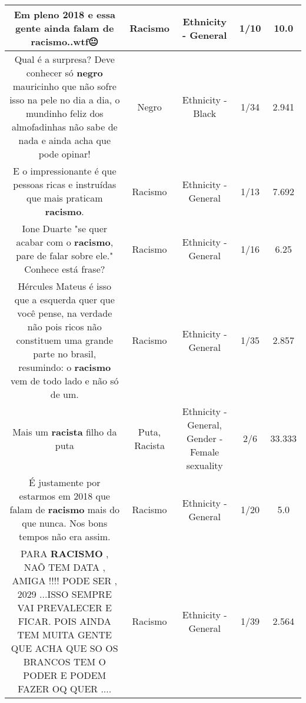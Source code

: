 \documentclass[11pt]{article}
\newlength\mylength
\begin{document}
\begin{center}
\begin{longtable}{|C{.65\mylength}|C{.30\mylength}|C{.12\mylength}|C{.12\mylength}|C{.12\mylength}|}
  \small Em pleno 2018 e essa gente ainda falam de \textbf{racismo}..wtf😐\normalsize   & Racismo & Ethnicity - General & 1/10 & 10.0 \\  \hline
  \small Qual é a surpresa? Deve conhecer só \textbf{negro} mauricinho que não sofre isso na pele no dia a dia, o mundinho feliz dos almofadinhas não sabe de nada e ainda acha que pode opinar!\normalsize   & Negro & Ethnicity - Black & 1/34 & 2.941 \\  \hline
  \small E o impressionante é  que pessoas ricas e instruídas que mais praticam \textbf{racismo}.\normalsize   & Racismo & Ethnicity - General & 1/13 & 7.692 \\  \hline
  \small Ione Duarte "se quer acabar com o \textbf{racismo}, pare de falar sobre ele." Conhece está frase?\normalsize   & Racismo & Ethnicity - General & 1/16 & 6.25 \\  \hline
  \small Hércules Mateus é isso que a esquerda quer que você pense, na verdade não pois ricos não constituem uma grande parte no brasil, resumindo: o \textbf{racismo} vem de todo lado e não só de um.\normalsize   & Racismo & Ethnicity - General & 1/35 & 2.857 \\  \hline
  \small Mais um \textbf{racista} filho da puta\normalsize   & Puta, Racista & Ethnicity - General, Gender - Female sexuality & 2/6 & 33.333 \\  \hline
  \small É justamente por estarmos em 2018 que falam de \textbf{racismo} mais do que nunca. Nos bons tempos não era assim.\normalsize   & Racismo & Ethnicity - General & 1/20 & 5.0 \\  \hline
  \small PARA \textbf{RACISMO} , NAÕ TEM DATA , AMIGA  !!!!  PODE SER , 2029  ...ISSO SEMPRE VAI PREVALECER E FICAR.  POIS AINDA TEM MUITA GENTE QUE ACHA QUE SO OS BRANCOS TEM O PODER E PODEM FAZER OQ QUER ....\normalsize   & Racismo & Ethnicity - General & 1/39 & 2.564 \\  \hline

\end{longtable}
\end{center}
\end{document}
